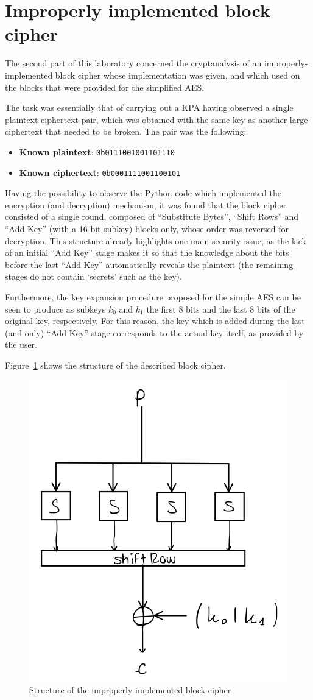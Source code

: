 \documentclass[12pt]{article}
\begin{document}
\section{Improperly implemented block cipher}
\label{sec:03}

The second part of this laboratory concerned the cryptanalysis of an improperly-implemented block cipher whose implementation was given, and which used on the blocks that were provided for the simplified AES.\@

The task was essentially that of carrying out a KPA having observed a single plaintext-ciphertext pair, which was obtained with the same key as another large ciphertext that needed to be broken.
The pair was the following:

\begin{itemize}
   \item \textbf{Known plaintext}: \verb|0b0111001001101110|
   \item \textbf{Known ciphertext}: \verb|0b0001111001100101| 
\end{itemize}

Having the possibility to observe the Python code which implemented the encryption (and decryption) mechanism, it was found that the block cipher consisted of a single round, composed of ``Substitute Bytes'', ``Shift Rows'' and ``Add Key'' (with a 16-bit subkey) blocks only, whose order was reversed for decryption.
This structure already highlights one main security issue, as the lack of an initial ``Add Key'' stage makes it so that the knowledge about the bits before the last ``Add Key'' automatically reveals the plaintext (the remaining stages do not contain `secrets' such as the key).

Furthermore, the key expansion procedure proposed for the simple AES can be seen to produce as subkeys $k_0$ and $k_1$ the first 8 bits and the last 8 bits of the original key, respectively. For this reason, the key which is added during the last (and only) ``Add Key'' stage corresponds to the actual key itself, as provided by the user.

Figure~\ref{fig:3.1} shows the structure of the described block cipher.

\begin{figure} [ht]
   \centering
   \includegraphics[width = .5\linewidth]{improper_block_scheme.jpeg}
   \caption{Structure of the improperly implemented block cipher}
   \label{fig:3.1}
\end{figure}
\end{document}
